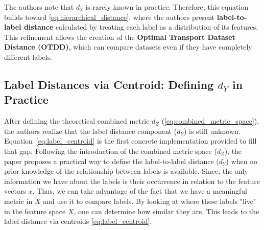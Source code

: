 \documentclass[11pt, a4paper]{article}
\theoremstyle{plain} %
\theoremstyle{definition} %
\begin{document}
			The authors note that $d_Y$ is rarely known in practice. Therefore, this equation builds toward \cref{eq:hierarchical_distance}, where the authors present \textbf{label-to-label distance} calculated by treating each label as a distribution of its features. This refinement allows the creation of the \textbf{Optimal Transport Dataset Distance (OTDD)}, which can compare datasets even if they have completely different labels.


		\subsection{Label Distances via Centroid: Defining $d_Y$ in Practice}
		\label{sec:label_distances_via_centroid}
			After defining the theoretical combined metric $d_Z$ (\cref{eq:combined_metric_space}), the authors realize that the label distance component ($d_Y$) is still unknown. Equation~\ref{eq:label_centroid} is the first concrete implementation provided to fill that gap. Following the introduction of the combined metric space ($d_Z$), the paper proposes a practical way to define the label-to-label distance ($d_Y$) when no prior knowledge of the relationship between labels is available. Since, the only information we have about the labels is their occurrence in relation to the feature vectors $x$. Thus, we can take advantage of the fact that we have a meaningful metric in $X$ and use it to compare labels. By looking at where these labels "live" in the feature space $X$, one can determine how similar they are. This leads to the label distance via centroids \cref{eq:label_centroid}.
\end{document}
